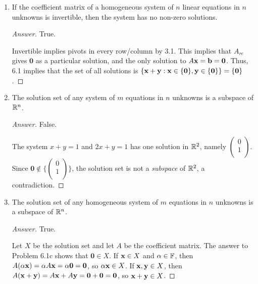 \documentclass[../psets.tex]{subfiles}
\begin{document}
\begin{enumerate}[label={\textbf{6.\arabic*.}}]
\begin{enumerate}
        \item If the coefficient matrix of a homogeneous system of $n$ linear equations in $n$ unknowns is invertible, then the system has no non-zero solutions.
        \begin{proof}[Answer]
            True.\par
            Invertible implies pivots in every row/column by 3.1. This implies that $A_{re}$ gives $\bm{0}$ as a particular solution, and the only solution to $A\mathbf{x}=\mathbf{b}=\bm{0}$. Thus, 6.1 implies that the set of all solutions is $\{\mathbf{x}+\mathbf{y}:\mathbf{x}\in\{\bm{0}\},\mathbf{y}\in\{\bm{0}\}\}=\{\bm{0}\}$.
        \end{proof}
        \item The solution set of any system of $m$ equations in $n$ unknowns is a subspace of $\mathbb{R}^n$.
        \begin{proof}[Answer]
            False.\par
            The system $x+y=1$ and $2x+y=1$ has one solution in $\mathbb{R}^2$, namely $
                \left( 
                    \begin{smallmatrix}
                        0\\
                        1\\
                    \end{smallmatrix}
                \right)
            $. Since $
                \bm{0}\notin\{\left( 
                    \begin{smallmatrix}
                        0\\
                        1\\
                    \end{smallmatrix}
                \right)\}
            $, the solution set is not a \emph{subspace} of $\mathbb{R}^2$, a contradiction.
        \end{proof}
        \item The solution set of any homogeneous system of $m$ equations in $n$ unknowns is a subspace of $\mathbb{R}^n$.
        \begin{proof}[Answer]
            True.\par
            Let $X$ be the solution set and let $A$ be the coefficient matrix. The answer to Problem 6.1c shows that $\bm{0}\in X$. If $\mathbf{x}\in X$ and $\alpha\in\mathbb{F}$, then $A(\alpha\mathbf{x})=\alpha A\mathbf{x}=\alpha\bm{0}=\bm{0}$, so $\alpha\mathbf{x}\in X$. If $\mathbf{x},\mathbf{y}\in X$, then $A(\mathbf{x}+\mathbf{y})=A\mathbf{x}+A\mathbf{y}=\bm{0}+\bm{0}=\bm{0}$, so $\mathbf{x}+\mathbf{y}\in X$.
        \end{proof}
    \end{enumerate}
\end{enumerate}
\end{document}
